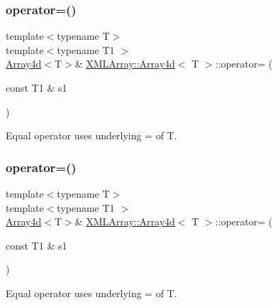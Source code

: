 \subsubsection{\texorpdfstring{operator=()}{operator=()}\hspace{0.1cm}{\footnotesize\ttfamily [4/6]}}
{\footnotesize\ttfamily template$<$typename T$>$ \\
template$<$typename T1 $>$ \\
\mbox{\hyperlink{classXMLArray_1_1Array4d}{Array4d}}$<$T$>$\& \mbox{\hyperlink{classXMLArray_1_1Array4d}{X\+M\+L\+Array\+::\+Array4d}}$<$ T $>$\+::operator= (\begin{DoxyParamCaption}\item[{const T1 \&}]{s1 }\end{DoxyParamCaption})\hspace{0.3cm}{\ttfamily [inline]}}



Equal operator uses underlying = of T. 

\mbox{\label{classXMLArray_1_1Array4d_a15b8c36a1edd1f72a12301798e0810b5}} 
\subsubsection{\texorpdfstring{operator=()}{operator=()}\hspace{0.1cm}{\footnotesize\ttfamily [5/6]}}
{\footnotesize\ttfamily template$<$typename T$>$ \\
template$<$typename T1 $>$ \\
\mbox{\hyperlink{classXMLArray_1_1Array4d}{Array4d}}$<$T$>$\& \mbox{\hyperlink{classXMLArray_1_1Array4d}{X\+M\+L\+Array\+::\+Array4d}}$<$ T $>$\+::operator= (\begin{DoxyParamCaption}\item[{const T1 \&}]{s1 }\end{DoxyParamCaption})\hspace{0.3cm}{\ttfamily [inline]}}



Equal operator uses underlying = of T. 

\mbox{\label{classXMLArray_1_1Array4d_a15b8c36a1edd1f72a12301798e0810b5}} 

